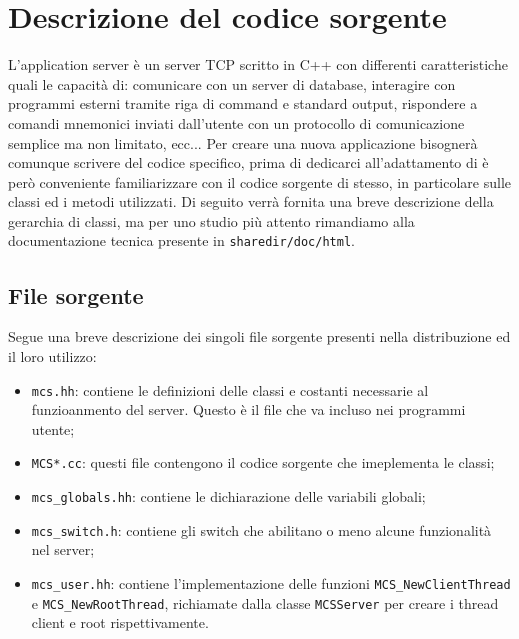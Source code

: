 \section{Descrizione del codice sorgente}
L'application server \mcs \`e un server TCP scritto in C++ con
differenti caratteristiche quali le capacit\`a di: comunicare con un
server di database, interagire con programmi esterni tramite riga di
command e standard output, rispondere a comandi mnemonici inviati
dall'utente con un protocollo di comunicazione semplice ma non
limitato, ecc... Per creare una nuova applicazione bisogner\`a
comunque scrivere del codice specifico, prima di dedicarci
all'adattamento di \mcs \`e per\`o conveniente familiarizzare
con il codice sorgente di \mcs stesso, in particolare sulle
classi ed i metodi utilizzati. Di seguito verr\`a fornita una breve
descrizione della gerarchia di classi, ma per uno studio pi\`u attento
rimandiamo alla documentazione tecnica presente in
\verb|sharedir/doc/html|.

\subsection{File sorgente}
Segue una breve descrizione dei singoli file sorgente presenti nella
distribuzione ed il loro utilizzo:
\begin{itemize}
\item \verb|mcs.hh|: contiene le definizioni delle classi e costanti
  necessarie al funzioanmento del server. Questo \`e il file che va
  incluso nei programmi utente;
\item \verb|MCS*.cc|: questi file contengono il codice sorgente che
  imeplementa le classi;
\item \verb|mcs_globals.hh|: contiene le dichiarazione delle variabili
  globali;
\item \verb|mcs_switch.h|: contiene gli switch che abilitano o meno
  alcune funzionalit\`a nel server;
\item \verb|mcs_user.hh|: contiene l'implementazione delle funzioni
  \verb|MCS_NewClientThread| e \verb|MCS_NewRootThread|, richiamate
  dalla classe \verb|MCSServer| per creare i thread client e root
  rispettivamente.
\end{itemize}



